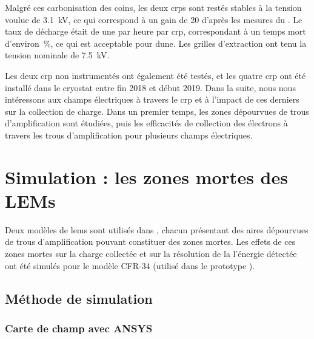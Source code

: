       Malgré ces carbonisation des coins, les deux \glspl{crp} sont restés stables à la tension voulue de \SI{3.1}{\kilo\volt}, ce qui correspond à un gain de 20 d'après les mesures du \threeL{}. Le taux de décharge était de une par heure par \gls{crp}, correspondant à un temps mort d'environ \,\%, ce qui est acceptable pour \gls{dune}. Les grilles d'extraction ont tenu la tension nominale de \SI{7.5}{\kilo\volt}. 

      Les deux \gls{crp} non instrumentés ont également été testés, et les quatre \gls{crp} ont été installé dans le cryostat entre fin 2018 et début 2019. Dans la suite, nous nous intéressons aux champs électriques à travers le \gls{crp} et à l'impact de ces derniers sur la collection de charge. Dans un premier temps, les zones dépourvues de trous d'amplification sont étudiées, puis les efficacités de collection des électrons à travers les trous d'amplification pour plusieurs champs électriques.
        
  \section{Simulation : les zones mortes des LEMs}\label{sec::dead_zones}
    
    Deux modèles de \glspl{lem} sont utilisés dans \protodp{}, chacun présentant des aires dépourvues de trous d'amplification pouvant constituer des zones mortes. Les effets de ces zones mortes sur la charge collectée et sur la résolution de la l'énergie détectée ont été simulés pour le modèle CFR-34 (utilisé dans le prototype \TOO{}). %
        
    \subsection{Méthode de simulation}
        
      \subsubsection{Carte de champ avec ANSYS}
                
